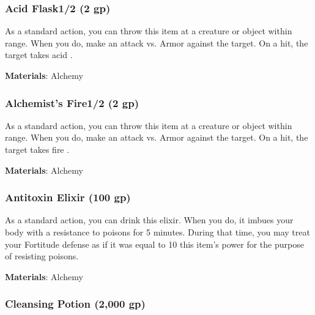 
\lowercase{\hypertarget{item:Acid Flask}{}}\label{item:Acid Flask}
\hypertarget{item:Acid Flask}{\subsubsection{Acid Flask\hfill1/2 (2 gp)}}

As a standard action, you can throw this item at a creature or object within \rngclose range.
When you do, make an attack vs. Armor against the target.
On a hit, the target takes acid .



\vspace{0.25em}
\textbf{Materials}: Alchemy


\lowercase{\hypertarget{item:Alchemist's Fire}{}}\label{item:Alchemist's Fire}
\hypertarget{item:Alchemist's Fire}{\subsubsection{Alchemist's Fire\hfill1/2 (2 gp)}}

As a standard action, you can throw this item at a creature or object within \rngclose range.
When you do, make an attack vs. Armor against the target.
On a hit, the target takes fire .



\vspace{0.25em}
\textbf{Materials}: Alchemy


\lowercase{\hypertarget{item:Antitoxin Elixir}{}}\label{item:Antitoxin Elixir}
\hypertarget{item:Antitoxin Elixir}{\subsubsection{Antitoxin Elixir\hfill{} (100 gp)}}

As a standard action, you can drink this elixir.
When you do, it imbues your body with a resistance to poisons for 5 minutes.
During that time, you may treat your Fortitude defense as if it was equal to 10 \add this item's power for the purpose of resisting poisons.



\vspace{0.25em}
\textbf{Materials}: Alchemy


\lowercase{\hypertarget{item:Cleansing Potion}{}}\label{item:Cleansing Potion}
\hypertarget{item:Cleansing Potion}{\subsubsection{Cleansing Potion\hfill{} (2,000 gp)}}

